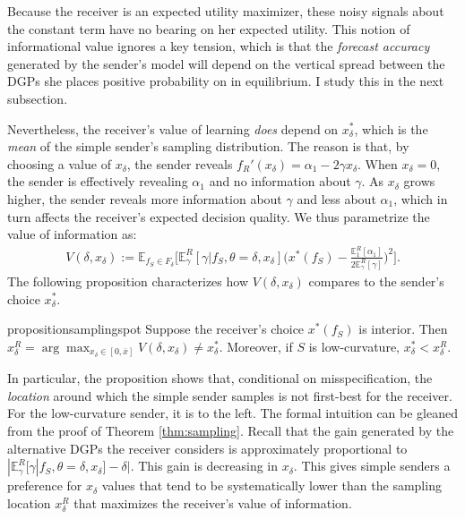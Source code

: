 \documentclass[11pt,dvipsnames]{article}
\begin{document}
Because the receiver is an expected utility maximizer, these noisy signals about the constant term have no bearing on her expected utility.
This notion of informational value ignores a key tension, which is that the \emph{forecast accuracy} generated by the sender's model will depend on the vertical spread between the DGPs she places positive probability on in equilibrium.
I study this in the next subsection.

Nevertheless, the receiver's value of learning \emph{does} depend on $x_\delta^*$, which is the \emph{mean} of the simple sender's sampling distribution.
The reason is that, by choosing a value of $x_\delta$, the sender reveals $f_R'(x_\delta) = \alpha_1-2\gamma x_\delta$.
When $x_\delta = 0$, the sender is effectively revealing $\alpha_1$ and no information about $\gamma$.
As $x_\delta$ grows higher, the sender reveals more information about $\gamma$ and less about $\alpha_1$, which in turn affects the receiver's expected decision quality.
We thus parametrize the value of information as:
\begin{align*}
V(\delta,x_\delta) :=\mathbb{E}_{f_S \in F_\delta}\bigg[\mathbb{E}_{\gamma}^R[\gamma|f_S,\theta=\delta,x_\delta]\bigg(x^*(f_S)-\frac{\mathbb{E}_1^R[\alpha_1]}{2\mathbb{E}_\gamma^R[\gamma]}\bigg)^2\bigg].
\end{align*}
The following proposition characterizes how $V(\delta,x_\delta)$ compares to the sender's choice $x_\delta^*$.
\begin{restatable}{proposition}{samplingspot}
Suppose the receiver's choice $x^*(f_S)$ is interior.
Then $x_\delta^R = \arg\max_{x_\delta\in[0,\overline{x}]}V(\delta,x_\delta) \neq x_\delta^*$.
Moreover, if $S$ is low-curvature, $x_\delta^*< x_\delta^R$.
\label{prop:samplingspot}
\end{restatable}
In particular, the proposition shows that, conditional on misspecification, the \emph{location} around which the simple sender samples is not first-best for the receiver.
For the low-curvature sender, it is to the left.
The formal intuition can be gleaned from the proof of Theorem \ref{thm:sampling}.
Recall that the gain generated by the alternative DGPs the receiver considers is approximately proportional to $|\mathbb{E}_\gamma^R[\gamma|f_S,\theta=\delta,x_\delta]-\delta|$.
This gain is decreasing in $x_\delta$.
This gives simple senders a preference for $x_\delta$ values that tend to be systematically lower than the sampling location $x_\delta^R$ that maximizes the receiver's value of information.
\end{document}
